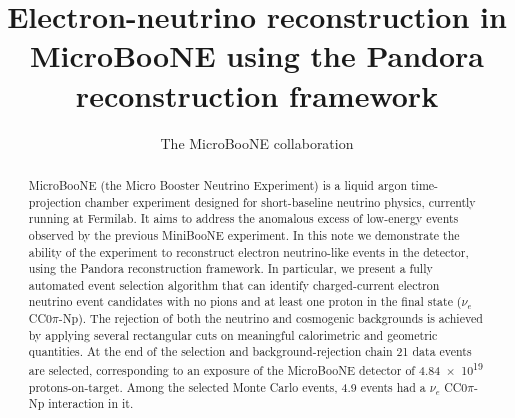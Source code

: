 \documentclass[a4paper]{article}
\title{Electron-neutrino reconstruction in MicroBooNE using the Pandora reconstruction framework}
\author{The MicroBooNE collaboration}
\begin{document}
\maketitle
\tableofcontents

\listoftodos

\begin{abstract}
MicroBooNE (the Micro Booster Neutrino Experiment) is a liquid argon
time-projection chamber experiment designed for short-baseline neutrino physics, currently running at Fermilab. It aims to address the anomalous excess of low-energy events observed by the previous MiniBooNE experiment. In this note we demonstrate the ability of the experiment to reconstruct electron neutrino-like events in the detector, using the Pandora reconstruction framework. In particular, we present a fully automated event selection algorithm that can identify charged-current electron neutrino event candidates with no pions and at least one proton in the final state ($\nu_{e}$ CC0$\pi$-Np). The rejection of both the neutrino and cosmogenic backgrounds is achieved by applying several rectangular cuts on meaningful calorimetric and geometric quantities. At the end of the selection and background-rejection chain 21 data events are selected, corresponding to an exposure of the MicroBooNE detector of \num{4.84e19} protons-on-target. Among the selected Monte Carlo events, 4.9 events had a $\nu_{e}$ CC0$\pi$-Np interaction in it.
\end{abstract}










\newpage
\end{document}
